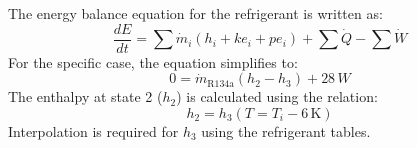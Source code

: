 The energy balance equation for the refrigerant is written as:  
\[
\frac{dE}{dt} = \sum \dot{m}_i (h_i + ke_i + pe_i) + \sum \dot{Q} - \sum \dot{W}
\]  
For the specific case, the equation simplifies to:  
\[
0 = \dot{m}_{\text{R134a}} (h_2 - h_3) + 28 \, W
\]  
The enthalpy at state 2 (\(h_2\)) is calculated using the relation:  
\[
h_2 = h_3 (T = T_i - 6 \, \text{K})
\]  
Interpolation is required for \(h_3\) using the refrigerant tables.